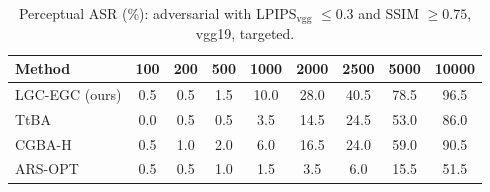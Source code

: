 \begin{table}[t]
\centering\footnotesize
\caption{Perceptual ASR (\%): adversarial with LPIPS$_{\mathrm{vgg}}$ $\le 0.3$ and SSIM $\ge 0.75$, vgg19, targeted.}
\begin{tabular}{lcccccccc}
\toprule
Method & 100 & 200 & 500 & 1000 & 2000 & 2500 & 5000 & 10000 \\
\midrule
LGC-EGC (ours) & 0.5 & 0.5 & 1.5 & 10.0 & 28.0 & 40.5 & 78.5 & 96.5 \\
TtBA & 0.0 & 0.5 & 0.5 & 3.5 & 14.5 & 24.5 & 53.0 & 86.0 \\
CGBA-H & 0.5 & 1.0 & 2.0 & 6.0 & 16.5 & 24.0 & 59.0 & 90.5 \\
ARS-OPT & 0.5 & 0.5 & 1.0 & 1.5 & 3.5 & 6.0 & 15.5 & 51.5 \\
\bottomrule
\end{tabular}
\end{table}
